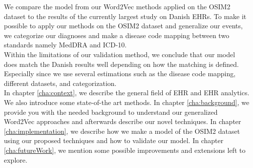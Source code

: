 We compare the model from our Word2Vec methods applied on the OSIM2 dataset to the results of the currently largest study on Danish EHRs. To make it possible to apply our methods on the OSIM2 dataset and generalize our events, we categorize our diagnoses and make a disease code mapping between two standards namely MedDRA and ICD-10. \\

Within the limitations of our validation method, we conclude that our model does match the Danish results well depending on how the matching is defined. Especially since we use several estimations such as the disease code mapping, different datasets, and categorization. \\

In chapter \ref{cha:context}, we describe the general field of EHR and EHR analytics. We also introduce some state-of-the art methods. In chapter \ref{cha:background}, we provide you with the needed background to understand our generalized Word2Vec approaches and afterwards describe our novel techniques. In chapter \ref{cha:implementation}, we describe how we make a model of the OSIM2 dataset using our proposed techniques and how to validate our model. In chapter \ref{cha:futureWork}, we mention some possible improvements and extensions left to explore.

